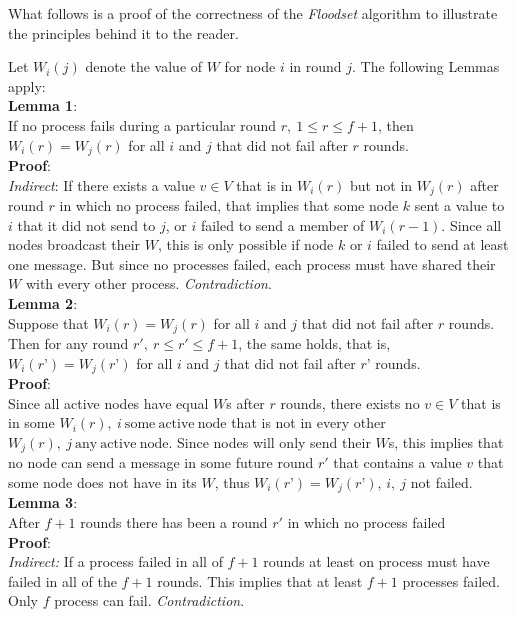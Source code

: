 \documentclass[fleqn]{article}
\begin{document}
\noindent What follows is a proof of the correctness of the \textit{Floodset} algorithm to illustrate the principles behind it to the reader.

Let $W_i(j)$ denote the value of $W$ for node $i$ in round $j$. The following Lemmas apply:\\

\noindent \textbf{Lemma 1}:\\
If no process fails during a particular round $r,\ 1 \le r \le f + 1$, then $W_i(r) = W_j(r)$ for all $i$ and $j$ that did not fail after $r$ rounds.\\
\textbf{Proof}:\\
\textit{Indirect}: If there exists a value $v \in V$ that is in $W_i(r)$ but not in $W_j(r)$ after round $r$ in which no process failed, that implies that some node $k$ sent a value to $i$ that it did not send to $j$, or $i$ failed to send a member of $W_i(r-1)$. Since all nodes broadcast their $W$, this is only possible if node $k$ or $i$ failed to send at least one message. But since no processes failed, each process must have shared their $W$ with every other process. \textit{Contradiction}. \\

\noindent \textbf{Lemma 2}:\\
Suppose that $W_i(r) = W_j(r)$ for all $i$ and $j$ that did not fail after $r$ rounds. Then for any round $r',\ r \le r' ≤ f + 1$, the same holds, that is, $W_i(r’) = W_j(r’)$ for all $i$ and $j$ that did not fail after $r’$ rounds.\\
\textbf{Proof}:\\
Since all active nodes  have equal $W$s after $r$ rounds, there exists no $v \in V$ that is in some $W_i(r),\ i\ \mathrm{some\ active\ node}$ that is not in every other $W_j(r),\ j\ \mathrm{any\ active\ node}$.
Since nodes will only send their $W$s, this implies that no node can send a message in some future round $r'$ that contains a value $v$ that some node does not have in its $W$, thus $W_i(r’) = W_j(r’)$, $i,\ j$ not failed.\\

\noindent \textbf{Lemma 3}:\\
After $f+1$ rounds there has been a round $r'$ in which no process failed\\
\textbf{Proof}:\\
\textit{Indirect:} If a process failed in all of $f+1$ rounds at least on process must have failed in all of the $f+1$ rounds. This implies
that at least $f+1$ processes failed. Only $f$ process can fail. \textit{Contradiction}.\\
\end{document}
